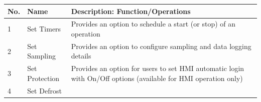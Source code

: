 \begin{longtable}[]{@{}lll@{}}
\toprule
\begin{minipage}[b]{0.07\columnwidth}\raggedright
No.\strut
\end{minipage} & \begin{minipage}[b]{0.25\columnwidth}\raggedright
Name\strut
\end{minipage} & \begin{minipage}[b]{0.60\columnwidth}\raggedright
Description: Function/Operations\strut
\end{minipage}\tabularnewline
\midrule
\endhead
\begin{minipage}[t]{0.07\columnwidth}\raggedright
1\strut
\end{minipage} & \begin{minipage}[t]{0.25\columnwidth}\raggedright
Set Timers\strut
\end{minipage} & \begin{minipage}[t]{0.60\columnwidth}\raggedright
Provides an option to schedule a start (or stop) of an operation\strut
\end{minipage}\tabularnewline
\begin{minipage}[t]{0.07\columnwidth}\raggedright
2\strut
\end{minipage} & \begin{minipage}[t]{0.25\columnwidth}\raggedright
Set Sampling\strut
\end{minipage} & \begin{minipage}[t]{0.60\columnwidth}\raggedright
Provides an option to configure sampling and data logging details\strut
\end{minipage}\tabularnewline
\begin{minipage}[t]{0.07\columnwidth}\raggedright
3\strut
\end{minipage} & \begin{minipage}[t]{0.25\columnwidth}\raggedright
Set Protection\strut
\end{minipage} & \begin{minipage}[t]{0.60\columnwidth}\raggedright
Provides an option for users to set HMI automatic login with On/Off
options (available for HMI operation only)\strut
\end{minipage}\tabularnewline
\begin{minipage}[t]{0.07\columnwidth}\raggedright
4\strut
\end{minipage} & \begin{minipage}[t]{0.25\columnwidth}\raggedright
Set Defrost\strut
\end{minipage} & \begin{minipage}[t]{0.60\columnwidth}\raggedright

\end{minipage}
\end{longtable}
